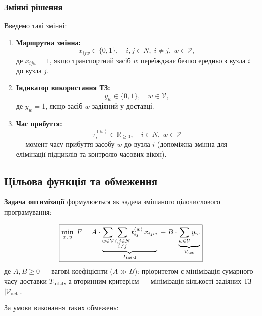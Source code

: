 \documentclass[14pt,a4paper]{extarticle}
\theoremstyle{definition}
\theoremstyle{plain}
\newcommand{\Real}{\mathbb{R}}
\begin{document}
\subsubsection{Змінні рішення}

Введемо такі змінні:

\begin{enumerate}[leftmargin=2em]
    \item \textbf{Маршрутна змінна:}
    \[
        x_{ijw} \in \{0, 1\}, \quad i, j \in N,\; i \neq j,\; w \in \mathcal{V},
    \]
    де $x_{ijw} = 1$, якщо транспортний засіб $w$ переїжджає безпосередньо з вузла $i$ до вузла $j$.

    \item \textbf{Індикатор використання ТЗ:}
    \[
        y_w \in \{0, 1\}, \quad w \in \mathcal{V},
    \]
    де $y_w = 1$, якщо засіб $w$ задіяний у доставці.

    \item \textbf{Час прибуття:}
    \[
        \tau_i^{(w)} \in \Real_{\geq 0}, \quad i \in N,\; w \in \mathcal{V}
    \]
    --- момент часу прибуття засобу $w$ до вузла $i$ (допоміжна змінна для елімінації підциклів та контролю часових вікон).
\end{enumerate}

\subsection{Цільова функція та обмеження}

\textbf{Задача оптимізації} формулюється як задача змішаного цілочислового програмування:

\[
    \boxed{
    \min_{x,\, y} \; F
    = A \cdot \underbrace{\sum_{w \in \mathcal{V}} \sum_{\substack{i,j \in N \\ i \neq j}} t_{ij}^{(w)}\, x_{ijw}}_{T_{\mathrm{total}}}
    \;+\; B \cdot \underbrace{\sum_{w \in \mathcal{V}} y_w\vphantom{\sum_{\substack{i,j}}}}_{|\mathcal{V}_{\mathrm{act}}|}
    }
\]
де $A, B \geq 0$ --- вагові коефіцієнти ($A \gg B$): пріоритетом є мінімізація сумарного часу доставки $T_{\mathrm{total}}$, а вторинним критерієм --- мінімізація кількості задіяних ТЗ -- $|\mathcal{V}_{\mathrm{act}}|$.

\medskip

За умови виконання таких обмежень:
\end{document}
